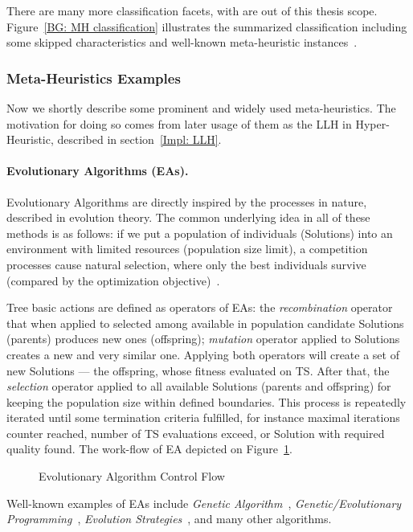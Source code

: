 There are many more classification facets, with are out of this thesis scope. Figure~\ref{BG: MH classification} illustrates the summarized classification including some skipped characteristics and well-known meta-heuristic instances~\cite{wiki_MH_classification}.


\subsubsection{Meta-Heuristics Examples}\label{BG: MH Examples}
Now we shortly describe some prominent and widely used meta-heuristics. The motivation for doing so comes from later usage of them as the LLH in Hyper-Heuristic, described in section~\ref{Impl: LLH}.

\paragraph{Evolutionary Algorithms (EAs).} Evolutionary Algorithms are directly inspired by the processes in nature, described in evolution theory. The common underlying idea in all of these methods is as follows: if we put a population of individuals (Solutions) into an environment with limited resources (population size limit), a competition processes cause natural selection, where only the best individuals survive (compared by the optimization objective)~\cite{eiben2015evolutionary}.

Tree basic actions are defined as operators of EAs: the \textit{recombination} operator that when applied to selected among available in population candidate Solutions (parents) produces new ones (offspring); \textit{mutation} operator applied to Solutions creates a new and very similar one. 
Applying both operators will create a set of new Solutions — the offspring, whose fitness evaluated on TS. After that, the \textit{selection} operator applied to all available Solutions (parents and offspring) for keeping the population size within defined boundaries. This process is repeatedly iterated until some termination criteria fulfilled, for instance maximal iterations counter reached, number of TS evaluations exceed, or Solution with required quality found. The work-flow of EA depicted on Figure~\ref{bg:pic:EAs}.

\begin{figure}
	\centering
	
	\caption{Evolutionary Algorithm Control Flow}
	\label{bg:pic:EAs}
\end{figure}

Well-known examples of EAs include \textit{Genetic Algorithm}~\cite{sastry2005genetic}, \textit{Genetic/Evolutionary Programming}~\cite{koza1992evolution}, \textit{Evolution Strategies}~\cite{beyer2002evolution}, and many other algorithms.

